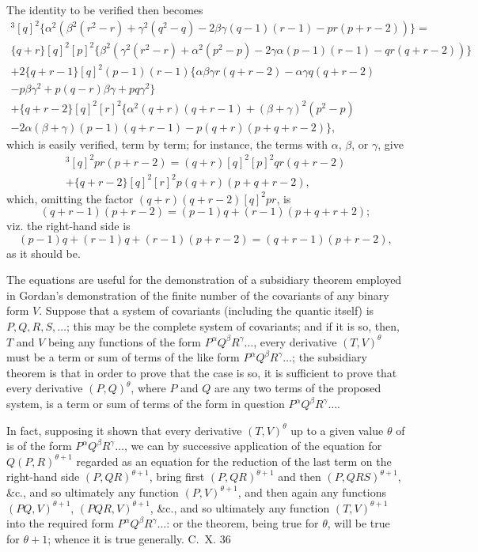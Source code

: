 \documentclass[12pt,a4paper]{article}
\theoremstyle{cayley}
\theoremstyle{definition}
\numberwithin{equation}{section}
\begin{document}
The identity to be verified then becomes
\begin{multline*}
[q + r]^3 [q]^2 \{\alpha^2(\beta^2(r^2 - r) + \gamma^2(q^2 - q) - 2\beta\gamma(q - 1)(r - 1) - pr(p + r - 2))\} = \\
\{q + r\} [q]^2 [p]^2 \{\beta^2(\gamma^2(r^2 - r) + \alpha^2(p^2 - p) - 2\gamma\alpha(p - 1)(r - 1) - qr(q + r - 2))\} \\
+ 2\{q + r - 1\} [q]^2 (p - 1)(r - 1) \{\alpha\beta\gamma r(q + r - 2) - \alpha\gamma q(q + r - 2) \\
- p\beta\gamma^2 + p(q - r)\beta\gamma + pq\gamma^2\} \\
+ \{q + r - 2\} [q]^2 [r]^2 \{\alpha^2(q + r)(q + r - 1) + (\beta + \gamma)^2(p^2 - p) \\
- 2\alpha(\beta + \gamma)(p - 1)(q + r - 1) - p(q + r)(p + q + r - 2)\},
\end{multline*}
which is easily verified, term by term; for instance, the terms with $\alpha$, $\beta$, or $\gamma$, give
\begin{multline*}
[q + r]^3 [q]^2 pr(p + r - 2) = (q + r) [q]^2 [p]^2 qr(q + r - 2) \\
+ \{q + r - 2\} [q]^2 [r]^2 p(q + r)(p + q + r - 2),
\end{multline*}
which, omitting the factor $(q + r)(q + r - 2)[q]^2 pr$, is
\[
(q + r - 1)(p + r - 2) = (p - 1)q + (r - 1)(p + q + r + 2);
\]
viz. the right-hand side is
\[
(p - 1)q + (r - 1)q + (r - 1)(p + r - 2) = (q + r - 1)(p + r - 2),
\]
as it should be.

The equations are useful for the demonstration of a subsidiary theorem employed in Gordan's demonstration of the finite number of the covariants of any binary form $V$. Suppose that a system of covariants (including the quantic itself) is $P, Q, R, S, \ldots$; this may be the complete system of covariants; and if it is so, then, $T$ and $V$ being any functions of the form $P^\alpha Q^\beta R^\gamma \ldots$, every derivative $(T, V)^\theta$ must be a term or sum of terms of the like form $P^\alpha Q^\beta R^\gamma \ldots$; the subsidiary theorem is that in order to prove that the case is so, it is sufficient to prove that every derivative $(P, Q)^\theta$, where $P$ and $Q$ are any two terms of the proposed system, is a term or sum of terms of the form in question $P^\alpha Q^\beta R^\gamma \ldots$.

In fact, supposing it shown that every derivative $(T, V)^\theta$ up to a given value $\theta$ of is of the form $P^\alpha Q^\beta R^\gamma \ldots$, we can by successive application of the equation for $Q(P, R)^{\theta + 1}$ regarded as an equation for the reduction of the last term on the right-hand side $(P, QR)^{\theta + 1}$, bring first $(P, QR)^{\theta + 1}$ and then $(P, QRS)^{\theta + 1}$, \&c., and so ultimately any function $(P, V)^{\theta + 1}$, and then again any functions $(PQ, V)^{\theta + 1}$, $(PQR, V)^{\theta + 1}$, \&c., and so ultimately any function $(T, V)^{\theta + 1}$ into the required form $P^\alpha Q^\beta R^\gamma \ldots$: or the theorem, being true for $\theta$, will be true for $\theta + 1$; whence it is true generally.
\hfill C.~X. 36
\end{document}
